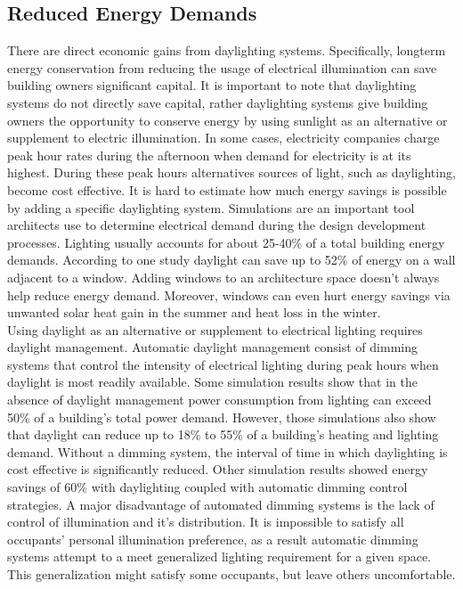   \subsection{Reduced Energy Demands}
    There are direct economic gains from daylighting systems. 
    Specifically, longterm energy conservation from reducing the usage of electrical illumination can save building owners significant capital.
    It is important to note that daylighting systems do not directly save capital, rather daylighting systems give building owners the opportunity to conserve energy by using sunlight as an alternative or supplement to electric illumination. In some cases, electricity companies charge peak hour rates during the afternoon when demand for electricity is at its highest. During these peak hours alternatives sources of light, such as daylighting, become cost effective.
    It is hard to estimate how much energy savings is possible by adding a specific daylighting system. Simulations are an important tool architects use to determine electrical demand during the design development processes.  Lighting usually accounts for about 25-40\% of a total building energy demands.
    According to one study daylight can save up to 52\% of energy on a wall adjacent to a window\cite{Leslie}.
    Adding windows to an architecture space doesn't always help reduce energy demand. Moreover, windows can even hurt energy savings via unwanted solar heat gain in the summer and heat loss in the winter. %
    \\

    Using daylight as an alternative or supplement to electrical lighting requires daylight management. Automatic daylight management consist of dimming systems that control the intensity of electrical lighting during peak hours when daylight is most readily available.  Some simulation results show that in the absence of daylight management power consumption from lighting can exceed 50\% of a building's total power demand.
    However, those simulations also show that daylight can reduce up to 18\% to 55\% of a building's heating and lighting demand\cite{Bodart}.
    Without a dimming system, the interval of time in which daylighting is cost effective is significantly reduced. Other simulation results showed energy savings of 60\% with daylighting coupled with automatic dimming control strategies\cite{Ihm}. 
    A major disadvantage of automated dimming systems is the lack of control of illumination and it's distribution. It is impossible to satisfy all occupants' personal illumination preference\cite{galasiu2006occupant}, as a result automatic dimming systems attempt to a meet generalized lighting requirement for a given space. This generalization might satisfy some occupants, but leave others uncomfortable.\\ 

